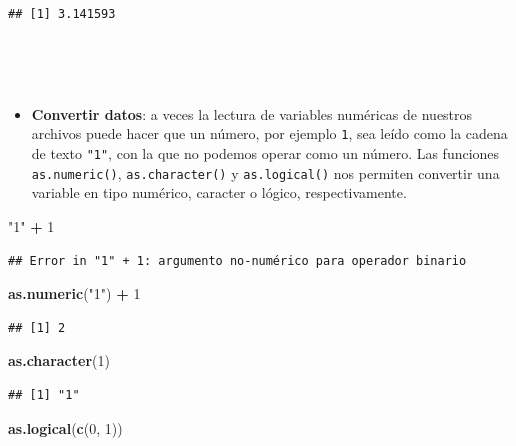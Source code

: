 \documentclass[11pt,]{book}
\newenvironment{Shaded}{\begin{snugshade}}{\end{snugshade}}
\newcommand{\DecValTok}[1]{\textcolor[rgb]{0.06,0.06,0.06}{#1}}
\newcommand{\KeywordTok}[1]{\textcolor[rgb]{0.27,0.27,0.27}{\textbf{#1}}}
\newcommand{\NormalTok}[1]{#1}
\newcommand{\OperatorTok}[1]{\textcolor[rgb]{0.43,0.43,0.43}{\textbf{#1}}}
\newcommand{\StringTok}[1]{\textcolor[rgb]{0.5,0.5,0.5}{#1}}
\providecommand{\tightlist}{%
  \setlength{\itemsep}{0pt}\setlength{\parskip}{0pt}}
\begin{document}
\begin{verbatim}
## [1] 3.141593
\end{verbatim}

~

~

\begin{itemize}
\tightlist
\item
  \textbf{Convertir datos}: a veces la lectura de variables numéricas de nuestros archivos puede hacer que un número, por ejemplo \texttt{1}, sea leído como la cadena de texto \texttt{"1"}, con la que no podemos operar como un número. Las funciones \texttt{as.numeric()}, \texttt{as.character()} y \texttt{as.logical()} nos permiten convertir una variable en tipo numérico, caracter o lógico, respectivamente.
\end{itemize}

\begin{Shaded}
\begin{Highlighting}[]
\StringTok{"1"} \OperatorTok{+}\StringTok{ }\DecValTok{1}
\end{Highlighting}
\end{Shaded}

\begin{verbatim}
## Error in "1" + 1: argumento no-numérico para operador binario
\end{verbatim}

\begin{Shaded}
\begin{Highlighting}[]
\KeywordTok{as.numeric}\NormalTok{(}\StringTok{"1"}\NormalTok{) }\OperatorTok{+}\StringTok{ }\DecValTok{1}
\end{Highlighting}
\end{Shaded}

\begin{verbatim}
## [1] 2
\end{verbatim}

\begin{Shaded}
\begin{Highlighting}[]
\KeywordTok{as.character}\NormalTok{(}\DecValTok{1}\NormalTok{)}
\end{Highlighting}
\end{Shaded}

\begin{verbatim}
## [1] "1"
\end{verbatim}

\begin{Shaded}
\begin{Highlighting}[]
\KeywordTok{as.logical}\NormalTok{(}\KeywordTok{c}\NormalTok{(}\DecValTok{0}\NormalTok{, }\DecValTok{1}\NormalTok{))}
\end{Highlighting}
\end{Shaded}
\end{document}
